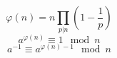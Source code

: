 $$
\varphi(n) = n\prod_{p|n}\left(1-\frac{1}{p}\right)
$$
$$
a^{\varphi(n)}\equiv 1\mod n
$$
$$
a^{-1}\equiv a^{\varphi(n)-1}\mod n
$$